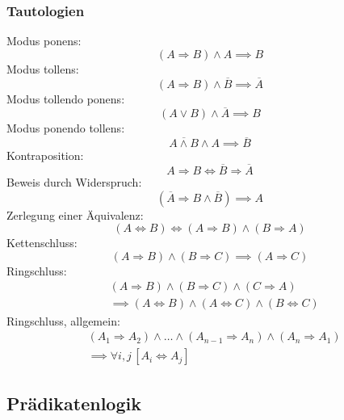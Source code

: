 \subsubsection{Tautologien}
Modus ponens:
\begin{equation}
(A\Rightarrow B)\land A\implies B
\end{equation}
Modus tollens:
\begin{equation}
(A\Rightarrow B)\land\overline B\implies\overline A
\end{equation}
Modus tollendo ponens:
\begin{equation}
(A\lor B)\land\overline A \implies B
\end{equation}
Modus ponendo tollens:
\begin{equation}
\overline{A\land B}\land A\implies\overline B
\end{equation}
Kontraposition:
\begin{equation}
A\Rightarrow B \iff \overline B\Rightarrow \overline A
\end{equation}
Beweis durch Widerspruch:
\begin{equation}
(\overline A\Rightarrow B\land\overline B)\implies A
\end{equation}
Zerlegung einer Äquivalenz:
\begin{equation}
(A\Leftrightarrow B) \iff (A\Rightarrow B)\land(B\Rightarrow A)
\end{equation}
Kettenschluss:
\begin{equation}
(A\Rightarrow B)\land(B\Rightarrow C)\implies (A\Rightarrow C)
\end{equation}
Ringschluss:
\begin{equation}
\begin{split}
&(A\Rightarrow B)\land (B\Rightarrow C)\land(C\Rightarrow A)\\
&\implies (A\Leftrightarrow B)\land(A\Leftrightarrow C)\land(B\Leftrightarrow C)
\end{split}
\end{equation}
Ringschluss, allgemein:
\begin{equation}
\begin{split}
& (A_1{\Rightarrow }A_2)\land\ldots\land(A_{n-1}{\Rightarrow}A_n)
\land(A_n{\Rightarrow}A_1)\\
& \implies \forall i,j\,[A_i\Leftrightarrow A_j]
\end{split}
\end{equation}


\subsection{Prädikatenlogik}
